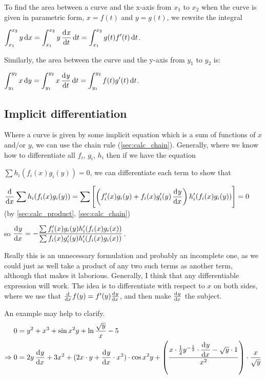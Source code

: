 \documentclass[a4paper,11pt]{article}
\begin{document}
    To find the area between a curve and the x-axis from $x_1$ to $x_2$ when the
    curve is given in parametric form, $x = f(t)$ and $y = g(t)$, we rewrite the
    integral

    $\displaystyle \int_{x_1}^{x_2} y \dif x =
     \int_{x_1}^{x_2} y \dod xt \dif t = \int_{x_1}^{x_2} g(t)f'(t) \dif t$.

    Similarly, the area between the curve and the y-axis from $y_1$ to $y_2$ is:

    $\displaystyle \int_{y_1}^{y_2} x \dif y =
     \int_{y_1}^{y_2} x \dod yt \dif t = \int_{y_1}^{y_2} f(t)g'(t) \dif t$.

    \subsection{Implicit differentiation}

    Where a curve is given by some implicit equation which is a sum of functions
    of $x$ and/or $y$, we can use the chain rule (\ref{sec:calc_chain}).
    Generally, where we know how to differentiate all $f_i$, $g_i$, $h_i$ then
    if we have the equation

    $\displaystyle \sum h_i(f_i(x)g_i(y)) = 0$, we can differentiate each term
    to show that

    $\displaystyle\dod{}{x} \sum h_i(f_i(x)g_i(y)) =
     \sum \left[\left(f_i'(x)g_i(y) +
                      f_i(x)g_i'(y)\dod yx\right)
                h_i'(f_i(x)g_i(y))\right] = 0$ (by \ref{sec:calc_product},
    \ref{sec:calc_chain})

    so $\displaystyle \dod yx = -\frac{\sum f_i'(x)g_i(y)h_i'(f_i(x)g_i(x))}
                                      {\sum f_i(x)g_i'(y)h_i'(f_i(x)g_i(x))}$.

    Really this is an unnecessary formulation and probably an incomplete one, as
    we could just as well take a product of any two such terms as another term,
    although that makes it laborious. Generally, I think that any differentiable
    expression will work. The idea is to differentiate with respect to $x$ on
    both sides, where we use that $\od{}{x}f(y) = f'(y)\od yx$, and then make
    $\od yx$ the subject.


    An example may help to clarify.
    \begin{align*}
    0 &= y^2 + x^3 + \sin x^2 y + \ln \frac{\sqrt y} x - 5 \\
    \Rightarrow 0 &=
                2y \dod yx + 3x^2 +
                (2x \cdot y + \dod yx \cdot x^2) \cdot \cos x^2 y +
                \left(\frac{x \cdot \frac 12 y^{-\frac 12} \cdot \dod yx -
                            \sqrt y \cdot 1}
                           {x^2}\right) \cdot \frac{x}{\sqrt y} \\
    \end{align*}
\end{document}
